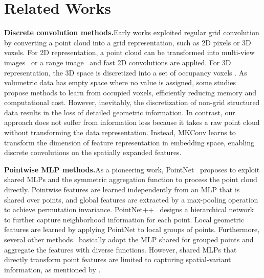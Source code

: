 \documentclass[preprint,12pt]{elsarticle}
\begin{document}
\section{Related Works}
\label{related}
\noindent\textbf{Discrete convolution methods.}\hspace{0.3cm}Early works exploited regular grid convolution by converting a point cloud into a grid representation, such as 2D pixels or 3D voxels. For 2D representation, a point cloud can be transformed into multi-view images~\citep{yang2019learning, liu2022vfmvac} or a range image~\citep{wu2019squeezesegv2,milioto2019rangenet++} and fast 2D convolutions are applied. For 3D representation, the 3D space is discretized into a set of occupancy voxels \citep{wu20153d,tchapmi2017segcloud}. As volumetric data has empty space where no value is assigned, some studies \cite{graham20183d,su2018splatnet} propose methods to learn from occupied voxels, efficiently reducing memory and computational cost. However, inevitably, the discretization of non-grid structured data results in the loss of detailed geometric information. In contrast, our approach does not suffer from information loss because it takes a raw point cloud without transforming the data representation. Instead, MKConv learns to transform the dimension of feature representation in embedding space, enabling discrete convolutions on the spatially expanded features.

\medskip	
\noindent\textbf{Pointwise MLP methods.}\hspace{0.3cm}As a pioneering work, PointNet~\citep{qi2017pointnet} proposes to exploit shared MLPs and the symmetric aggregation function to process the point cloud directly. Pointwise features are learned independently from an MLP that is shared over points, and global features are extracted by a max-pooling operation to achieve permutation invariance. PointNet++~\citep{qi2017pointnet++} designs a hierarchical network to further capture neighborhood information for each point. Local geometric features are learned by applying PointNet to local groups of points. Furthermore, several other methods~\citep{wang2019dynamic,liu2019densepoint,li2018so, zhang2019shellnet} basically adopt the MLP shared for grouped points and aggregate the features with diverse functions. However, shared MLPs that directly transform point features are limited to capturing spatial-variant information, as mentioned by \cite{xu2021paconv}.
\end{document}
